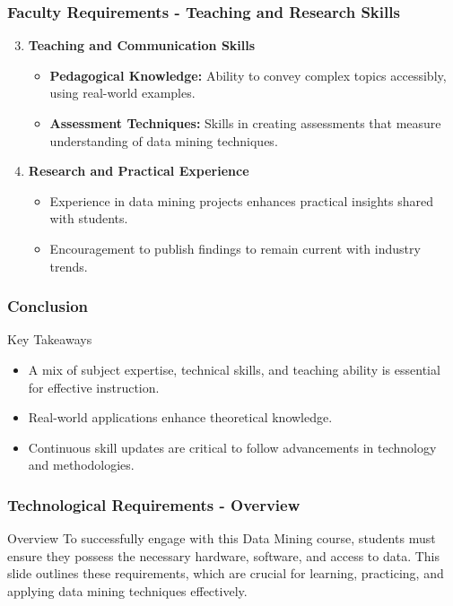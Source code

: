 \documentclass[aspectratio=169]{beamer}
\begin{document}
\begin{frame}
    \frametitle{Faculty Requirements - Teaching and Research Skills}
    \begin{enumerate}
        \setcounter{enumi}{2}
        \item \textbf{Teaching and Communication Skills}
        \begin{itemize}
            \item \textbf{Pedagogical Knowledge:} Ability to convey complex topics accessibly, using real-world examples.
            \item \textbf{Assessment Techniques:} Skills in creating assessments that measure understanding of data mining techniques.
        \end{itemize}
        
        \item \textbf{Research and Practical Experience}
        \begin{itemize}
            \item Experience in data mining projects enhances practical insights shared with students.
            \item Encouragement to publish findings to remain current with industry trends.
        \end{itemize}
    \end{enumerate}
\end{frame}

\begin{frame}
    \frametitle{Conclusion}
    \begin{block}{Key Takeaways}
        \begin{itemize}
            \item A mix of subject expertise, technical skills, and teaching ability is essential for effective instruction.
            \item Real-world applications enhance theoretical knowledge.
            \item Continuous skill updates are critical to follow advancements in technology and methodologies.
        \end{itemize}
    \end{block}
\end{frame}

\begin{frame}[fragile]
    \frametitle{Technological Requirements - Overview}
    \begin{block}{Overview}
        To successfully engage with this Data Mining course, students must ensure they possess the necessary hardware, software, and access to data. 
        This slide outlines these requirements, which are crucial for learning, practicing, and applying data mining techniques effectively.
    \end{block}
\end{frame}
\end{document}

